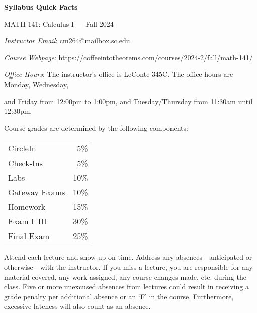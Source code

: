 \documentclass[11pt,letterpaper]{article}
\begin{document}
\begin{center} 
\bfseries
\color{scred}
\LARGE Syllabus Quick Facts \par\vspace{0.2\baselineskip}
\Large MATH 141: Calculus I --- Fall 2024
\end{center} \pspace


\hspace{0.53cm} {\itshape Instructor Email}: \href{mailto:cm264@mailbox.sc.edu}{cm264@mailbox.sc.edu} \par
\hspace{0.53cm} {\itshape Course Webpage}: \href{https://coffeeintotheorems.com/courses/2024-2/fall/math-141/}{https://coffeeintotheorems.com/courses/2024-2/fall/math-141/} \par
\hspace{0.53cm} {\itshape Office Hours}: The instructor's office is LeConte 345C. The office hours are Monday, Wednesday, \par \hspace{0.55cm} and Friday from 12:00pm to 1:00pm, and Tuesday/Thursday from 11:30am until 12:30pm. \pspace


Course grades are determined by the following components: \par \vspace{-0.3cm}
	\begin{table}[!ht]
        \begin{tabular}{lr}
	CircleIn & 5\% \\
	Check-Ins & 5\% \\
	Labs & 10\% \\
	Gateway Exams & 10\% \\
	Homework & 15\% \\
	Exam I--III & 30\% \\
	Final Exam & 25\%
        \end{tabular} 
        \end{table}


Attend each lecture and show up on time. Address any absences---anticipated or otherwise---with the instructor. If you miss a lecture, you are responsible for any material covered, any work assigned, any course changes made, etc. during the class. Five or more unexcused absences from lectures could result in receiving a grade penalty per additional absence or an `F' in the course. Furthermore, excessive lateness will also count as an absence. 
\pspace
\end{document}
